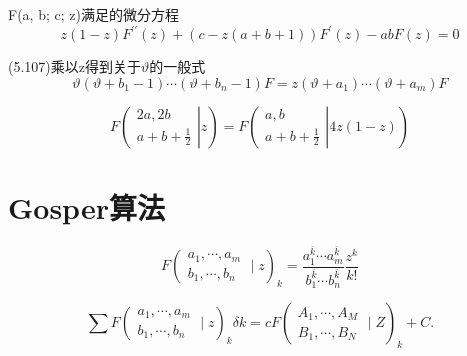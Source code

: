 F(a, b; c; z)满足的微分方程
\begin{equation}
    z(1-z) F^{\prime \prime}(z)+(c-z(a+b+1)) F^{\prime}(z)-a b F(z)=0
\end{equation}

(5.107)乘以z得到关于$\vartheta$的一般式
\begin{equation}
    \vartheta\left(\vartheta+b_{1}-1\right) \cdots\left(\vartheta+b_{n}-1\right) F=z\left(\vartheta+a_{1}\right) \cdots\left(\vartheta+a_{m}\right) F
\end{equation}

\begin{equation}
    \left.\left.F\left(\begin{array}{c}
    2 a, 2 b \\
    a+b+\frac{1}{2}
    \end{array}\right| z\right)=F\left(\begin{array}{c}
    a, b \\
    a+b+\frac{1}{2}
    \end{array}\right| 4 z(1-z)\right)
\end{equation}

\section{Gosper算法}

\setcounter{equation}{114}
\begin{equation}
    F\left(\begin{array}{c}
        a_{1}, \cdots, a_{m} \\
        b_{1}, \cdots, b_{n}
    \end{array} \mid z\right)_{k}=\frac{a_{1}^{\bar{k}} \cdots a_{m}^{\bar{k}}}{b_{1}^{\bar{k}} \cdots b_{n}^{\bar{k}}} \frac{z^{k}}{k !}
\end{equation}

\begin{equation}
    \sum F\left(\begin{array}{l}
        a_{1}, \cdots, a_{m} \\
        b_{1}, \cdots, b_{n}
        \end{array} \mid z\right)_{k} \delta k=c F\left(\begin{array}{l}
        A_{1}, \cdots, A_{M} \\
        B_{1}, \cdots, B_{N}
        \end{array} \mid Z\right)_{k}+C .
\end{equation}

